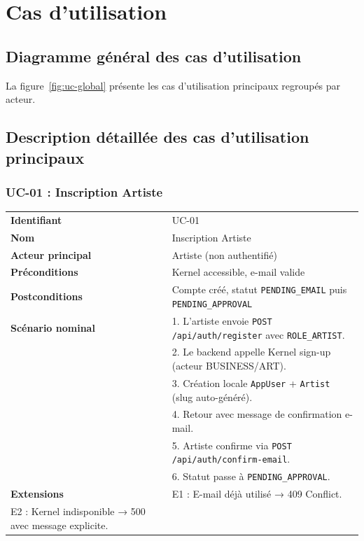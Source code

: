 \chapter{Cas d'utilisation}

\section{Diagramme général des cas d'utilisation}

La figure~\ref{fig:uc-global} présente les cas d'utilisation principaux regroupés par acteur.


\section{Description détaillée des cas d'utilisation principaux}

\subsection{UC-01 : Inscription Artiste}

\begin{table}[h]
  \centering
  \small
  \begin{tabular}{@{}p{3.5cm}p{10cm}@{}}
    \toprule
    \textbf{Identifiant} & UC-01 \\
    \textbf{Nom} & Inscription Artiste \\
    \textbf{Acteur principal} & Artiste (non authentifié) \\
    \textbf{Préconditions} & Kernel accessible, e-mail valide \\
    \textbf{Postconditions} & Compte créé, statut \texttt{PENDING\_EMAIL} puis \texttt{PENDING\_APPROVAL} \\
    \midrule
    \textbf{Scénario nominal} &
    1. L'artiste envoie \texttt{POST /api/auth/register} avec \texttt{ROLE\_ARTIST}.\\
    & 2. Le backend appelle Kernel sign-up (acteur BUSINESS/ART).\\
    & 3. Création locale \texttt{AppUser} + \texttt{Artist} (slug auto-généré).\\
    & 4. Retour avec message de confirmation e-mail.\\
    & 5. Artiste confirme via \texttt{POST /api/auth/confirm-email}.\\
    & 6. Statut passe à \texttt{PENDING\_APPROVAL}. \\
    \textbf{Extensions} &
    E1 : E-mail déjà utilisé → 409 Conflict.\\
    E2 : Kernel indisponible → 500 avec message explicite. \\
    \bottomrule
  \end{tabular}
\end{table}

